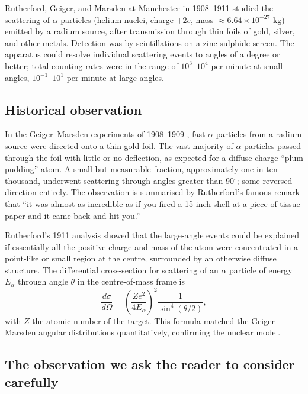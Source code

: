 \documentclass[11pt,twocolumn,a4paper]{article}
\theoremstyle{axiomstyle}
\theoremstyle{conseqstyle}
\theoremstyle{definition}
\theoremstyle{remark}
\begin{document}
Rutherford, Geiger, and Marsden at Manchester in 1908--1911 studied the scattering of $\alpha$ particles (helium nuclei, charge $+2e$, mass $\approx 6.64\times 10^{-27}$ kg) emitted by a radium source, after transmission through thin foils of gold, silver, and other metals. Detection was by scintillations on a zinc-sulphide screen. The apparatus could resolve individual scattering events to angles of a degree or better; total counting rates were in the range of $10^{3}$--$10^{4}$ per minute at small angles, $10^{-1}$--$10^{1}$ per minute at large angles.

\subsection{Historical observation}

In the Geiger--Marsden experiments of 1908--1909 \citep{geigermarsden1909}, fast $\alpha$ particles from a radium source were directed onto a thin gold foil. The vast majority of $\alpha$ particles passed through the foil with little or no deflection, as expected for a diffuse-charge ``plum pudding'' atom. A small but measurable fraction, approximately one in ten thousand, underwent scattering through angles greater than 90$^{\circ}$; some reversed direction entirely. The observation is summarised by Rutherford's famous remark that ``it was almost as incredible as if you fired a 15-inch shell at a piece of tissue paper and it came back and hit you.''

Rutherford's 1911 analysis \citep{rutherford1911} showed that the large-angle events could be explained if essentially all the positive charge and mass of the atom were concentrated in a point-like or small region at the centre, surrounded by an otherwise diffuse structure. The differential cross-section for scattering of an $\alpha$ particle of energy $E_{\alpha}$ through angle $\theta$ in the centre-of-mass frame is
\begin{equation}
\frac{d\sigma}{d\Omega}=\left(\frac{Ze^{2}}{4E_{\alpha}}\right)^{2}\frac{1}{\sin^{4}(\theta/2)},
\label{eq:rutherfordsigma}
\end{equation}
with $Z$ the atomic number of the target. This formula matched the Geiger--Marsden angular distributions quantitatively, confirming the nuclear model.

\subsection{The observation we ask the reader to consider carefully}
\end{document}
